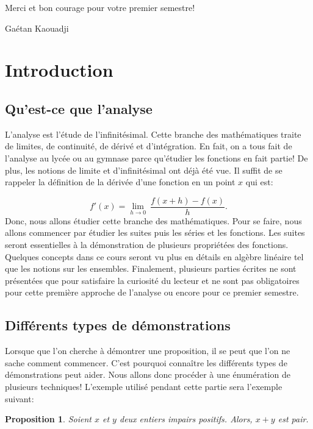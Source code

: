 \documentclass[a4paper, 12pt, french, twoside]{article}
\newtheorem{proposition}[theorem]{Proposition}
\begin{document}
\noindent
Merci et bon courage pour votre premier semestre!

\noindent
Gaétan Kaouadji

\newpage
\section{Introduction}

\subsection{Qu'est-ce que l'analyse}

L'analyse est l'étude de l'infinitésimal. Cette branche des mathématiques traite de limites, de continuité, de dérivé et d'intégration. En fait, on a tous fait de l'analyse au lycée ou au gymnase parce qu'étudier les fonctions en fait partie! De plus, les notions de limite et d'infinitésimal ont déjà été vue. Il suffit de se rappeler la définition de la dérivée d'une fonction en un point $x$ qui est: 

\begin{equation}
    f'(x)=\lim_{h\to 0}~\dfrac{f(x+h)-f(x)}{h}.
\end{equation}
Donc, nous allons étudier cette branche des mathématiques. Pour se faire, nous allons commencer par étudier les suites puis les séries et les fonctions. Les suites seront essentielles à la démonstration de plusieurs propriétées des fonctions. Quelques concepts dans ce cours seront vu plus en détails en algèbre linéaire tel que les notions sur les ensembles. Finalement, plusieurs parties écrites ne sont présentées que pour satisfaire la curiosité du lecteur et ne sont pas obligatoires pour cette première approche de l'analyse ou encore pour ce premier semestre. 




\subsection{Différents types de démonstrations}

Lorsque que l'on cherche à démontrer une proposition, il se peut que l'on ne sache comment commencer. C'est pourquoi connaître les différents types de démonstrations peut aider. Nous allons donc procéder à une énumération de plusieurs techniques!
L'exemple utilisé pendant cette partie sera l'exemple suivant:
\begin{proposition}
Soient $x$ et $y$ deux entiers impairs positifs. Alors, $x+y$ est pair.
\end{proposition}
\end{document}
